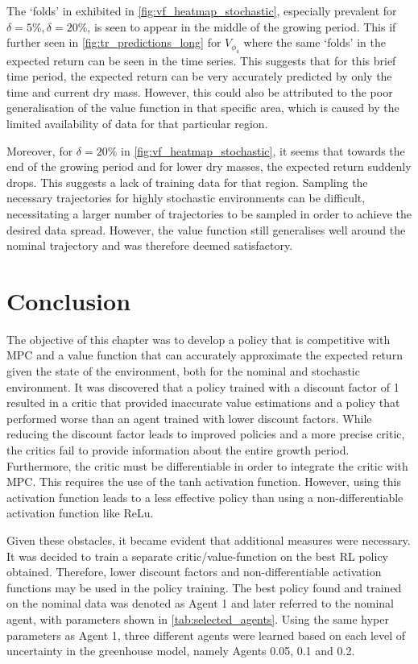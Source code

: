 The `folds' in exhibited in \autoref{fig:vf_heatmap_stochastic}, especially prevalent for $\delta = 5\%, \delta = 20\%$, is seen to appear in the middle of the growing period. This if further seen in \autoref{fig:tr_predictions_long} for $V_{\phi_4}$ where the same `folds' in the expected return can be seen in the time series. This suggests that for this brief time period, the expected return can be very accurately predicted by only the time and current dry mass. However, this could also be attributed to the poor generalisation of the value function in that specific area, which is caused by the limited availability of data for that particular region.

Moreover, for $\delta = 20\%$ in \autoref{fig:vf_heatmap_stochastic}, it seems that towards the end of the growing period and for lower dry masses, the expected return suddenly drops. This suggests a lack of training data for that region. Sampling the necessary trajectories for highly stochastic environments can be difficult, necessitating a larger number of trajectories to be sampled in order to achieve the desired data spread. However, the value function still generalises well around the nominal trajectory and was therefore deemed satisfactory.


\section{Conclusion}
The objective of this chapter was to develop a policy that is competitive with MPC and a value function that can accurately approximate the expected return given the state of the environment, both for the nominal and stochastic environment.
It was discovered that a policy trained with a discount factor of 1 resulted in a critic that provided inaccurate value estimations and a policy that performed worse than an agent trained with lower discount factors. While reducing the discount factor leads to improved policies and a more precise critic, the critics fail to provide information about the entire growth period. Furthermore, the critic must be differentiable in order to integrate the critic with MPC. This requires the use of the tanh activation function. However, using this activation function leads to a less effective policy than using a non-differentiable activation function like ReLu.

Given these obstacles, it became evident that additional measures were necessary. It was decided to train a separate critic/value-function on the best RL policy obtained. Therefore, lower discount factors and non-differentiable activation functions may be used in the policy training. The best policy found and trained on the nominal data was denoted as Agent 1 and later referred to the nominal agent, with parameters shown in \autoref{tab:selected_agents}. Using the same hyper parameters as Agent 1, three different agents were learned based on each level of uncertainty in the greenhouse model, namely Agents 0.05, 0.1 and 0.2. 

